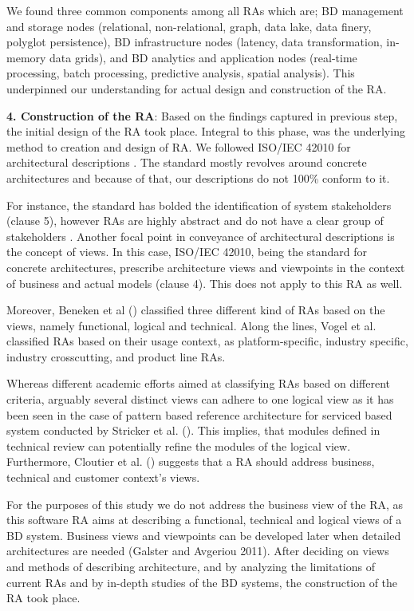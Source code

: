 \documentclass[runningheads]{llncs}
\begin{document}
We found three common components among all RAs which are; BD management and storage nodes (relational, non-relational, graph, data lake, data finery, polyglot persistence), BD infrastructure nodes (latency, data transformation, in-memory data grids), and BD analytics and application nodes (real-time processing, batch processing, predictive analysis, spatial analysis). This underpinned our understanding for actual design and construction of the RA.

\textbf{4. Construction of the RA}: Based on the findings captured in previous step, the initial design of the RA took place. Integral to this phase, was the underlying method to creation and design of RA. We followed ISO/IEC 42010 for architectural descriptions \cite{Chaabane}. The standard mostly revolves around concrete architectures and because of that, our descriptions do not 100\% conform to it.

For instance, the standard has bolded the identification of system stakeholders (clause 5), however RAs are highly abstract and do not have a clear group of stakeholders \cite{AtaeiACIS}. Another focal point in conveyance of architectural descriptions is the concept of views. In this case, ISO/IEC 42010, being the standard for concrete architectures, prescribe architecture views and viewpoints in the context of business and actual models (clause 4). This does not apply to this RA as well.

Moreover, Beneken et al (\cite{Beneken}) classified three different kind of RAs based on the views, namely functional, logical and technical. Along the lines, Vogel et al. \cite{Vogel} classified RAs based on their usage context, as platform-specific, industry specific, industry crosscutting, and product line RAs.

Whereas different academic efforts aimed at classifying RAs based on different criteria, arguably several distinct views can adhere to one logical view as it has been seen in the case of pattern based reference architecture for serviced based system conducted by Stricker et al. (\cite{Stricker}). This implies, that modules defined in technical review can potentially refine the modules of the logical view. Furthermore, Cloutier et al. (\cite{Cloutier}) suggests that a RA should address business, technical and customer context’s views.

For the purposes of this study we do not address the business view of the RA, as this software RA aims at describing a functional, technical and logical views of a BD system. Business views and viewpoints can be developed later when detailed architectures are needed (Galster and Avgeriou 2011).
After deciding on views and methods of describing architecture, and by analyzing the limitations of current RAs and by in-depth studies of the BD systems, the construction of the RA took place.
\end{document}
